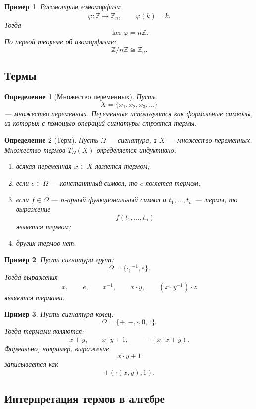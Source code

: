 \documentclass[12pt,a4paper]{article}
\newtheorem{definition}{Определение}
\newtheorem{example}{Пример}
\begin{document}
\begin{example}
Рассмотрим гомоморфизм
\[
\varphi\colon \mathbb Z\to \mathbb Z_n,
\qquad
\varphi(k)=\overline{k}.
\]
Тогда
\[
\ker\varphi=n\mathbb Z.
\]
По первой теореме об изоморфизме:
\[
\mathbb Z/n\mathbb Z\cong \mathbb Z_n.
\]
\end{example}

\subsection{Термы}

\begin{definition}[Множество переменных]
Пусть
\[
X=\{x_1,x_2,x_3,\dots\}
\]
--- множество переменных. Переменные используются как формальные символы, из которых с помощью операций сигнатуры строятся термы.
\end{definition}

\begin{definition}[Терм]
Пусть $\Omega$ --- сигнатура, а $X$ --- множество переменных. Множество термов $T_\Omega(X)$ определяется индуктивно:
\begin{enumerate}
    \item всякая переменная $x\in X$ является термом;
    \item если $c\in\Omega$ --- константный символ, то $c$ является термом;
    \item если $f\in\Omega$ --- $n$-арный функциональный символ и $t_1,\dots,t_n$ --- термы, то выражение
    \[
    f(t_1,\dots,t_n)
    \]
    является термом;
    \item других термов нет.
\end{enumerate}
\end{definition}

\begin{example}
Пусть сигнатура групп:
\[
\Omega=\{\cdot,{}^{-1},e\}.
\]
Тогда выражения
\[
x,\qquad e,\qquad x^{-1},\qquad x\cdot y,\qquad (x\cdot y^{-1})\cdot z
\]
являются термами.
\end{example}

\begin{example}
Пусть сигнатура колец:
\[
\Omega=\{+,-,\cdot,0,1\}.
\]
Тогда термами являются:
\[
x+y,\qquad x\cdot y+1,\qquad -(x\cdot x+y).
\]
Формально, например, выражение
\[
x\cdot y+1
\]
записывается как
\[
+( \cdot(x,y),1).
\]
\end{example}

\subsection{Интерпретация термов в алгебре}
\end{document}
